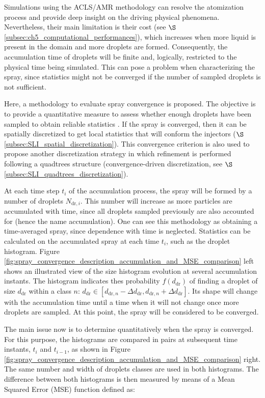 Simulations using the ACLS/AMR methodology can resolve the atomization process and provide deep insight on the driving physical phenomena. Nevertheless, their main limitation is their cost (see $\S$\ref{subsec:ch5_computational_performances}), which increases when more liquid is present in the domain and more droplets are formed. Consequently, the accumulation time of droplets will be finite and, logically, restricted to the physical time being simulated. This can pose a problem when characterizing the spray, since statistics might not be converged if the number of sampled droplets is not sufficient.

Here, a methodology to evaluate spray convergence is proposed. The objective is to provide a quantitative measure to assess whether enough droplets have been sampled to obtain reliable statistics . If the spray is converged, then it can be spatially discretized to get local statistics that will conform the injectors ($\S$\ref{subsec:SLI_spatial_discretization}). This convergence criterion is also used to propose another discretization strategy in which refinement is performed following a quadtrees structure (convergence-driven discretization, see $\S$\ref{subsec:SLI_quadtrees_discretization}).

At each time step $t_i$ of the accumulation process, the spray will be formed by a number of droplets $N_{\mathrm{dr},i}$. This number will increase as more particles are accumulated with time, since all droplets sampled previously are also accounted for (hence the name accumulation). One can see this methodology as obtaining a time-averaged spray, since dependence with time is neglected. Statistics can be calculated on the accumulated spray at each time $t_i$, such as the droplet histogram. Figure \ref{fig:spray_convergence_description_accumulation_and_MSE_comparison} left shows an illustrated view of the size histogram evolution at several accumulation instants. The histogram indicates thes probability $f \left( d_\mathrm{dr} \right)$ of finding a droplet of size $d_\mathrm{dr}$ within a class $n$: $d_\mathrm{dr} \in \left[ d_{\mathrm{dr},n}-\Delta d_\mathrm{dr}, d_{\mathrm{dr},n}+\Delta d_\mathrm{dr} \right]$. Its shape will change with the accumulation time until a time when it will not change once more droplets are sampled. At this point, the spray will be considered to be converged. 

The main issue now is to determine quantitatively when the spray is converged. For this purpose, the histograms are compared in pairs at subsequent time instants, $t_i$ and $t_{i-1}$, as shown in Figure \ref{fig:spray_convergence_description_accumulation_and_MSE_comparison} right. The same number and width of droplets classes are used in both histograms. The difference between both histograms is then measured by means of a Mean Squared Error (MSE) function defined as:


